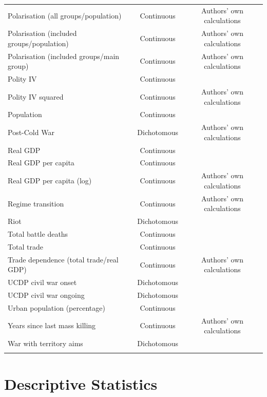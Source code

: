 \documentclass[a4paper,12pt]{article}
\begin{document}
\begin{table}[!htbp]
\begin{tabular}{@{\extracolsep{5pt}}lcc}
Polarisation (all groups/population) & Continuous &  Authors' own calculations  \\ 
Polarisation (included groups/population) & Continuous &  Authors' own calculations  \\ 
Polarisation (included groups/main group) & Continuous &  Authors' own calculations  \\ 
Polity IV & Continuous & \citet{marshall2017pitf}\\ 
Polity IV squared & Continuous & Authors' own calculations \\ 
Population & Continuous & \citet{gleditsch2002expanded} \\
Post-Cold War & Dichotomous & Authors' own calculations \\ 
Real GDP & Continuous & \citet{gleditsch2002expanded} \\ 
Real GDP per capita & Continuous & \citet{gleditsch2002expanded} \\ 
Real GDP per capita (log) & Continuous & Authors' own calculations  \\ 
Regime transition & Continuous & Authors' own calculations \\ 
Riot & Dichotomous & \citet{banks1999cross}\\ 
Total battle deaths & Continuous & \citet{lacina2005monitoring} \\  
Total trade & Continuous & \citet{cow2017cinc} \\ 
Trade dependence (total trade/real GDP) & Continuous & Authors' own calculations \\ 
UCDP civil war onset & Dichotomous & \citet{allansson2017organized,gleditsch2002armed} \\ 
UCDP civil war ongoing & Dichotomous & \citet{allansson2017organized,gleditsch2002armed} \\ 
Urban population (percentage) & Continuous & \citet{cow2017cinc} \\ 
Years since last mass killing & Continuous & Authors' own calculations \\ 
War with territory aims & Dichotomous & \citet{allansson2017organized,gleditsch2002armed} \\ 
\hline \\[-1.8ex] 
\end{tabular} 
\end{table} 

\newpage

\section{Descriptive Statistics}
\label{sec:mk-ds}
\end{document}
